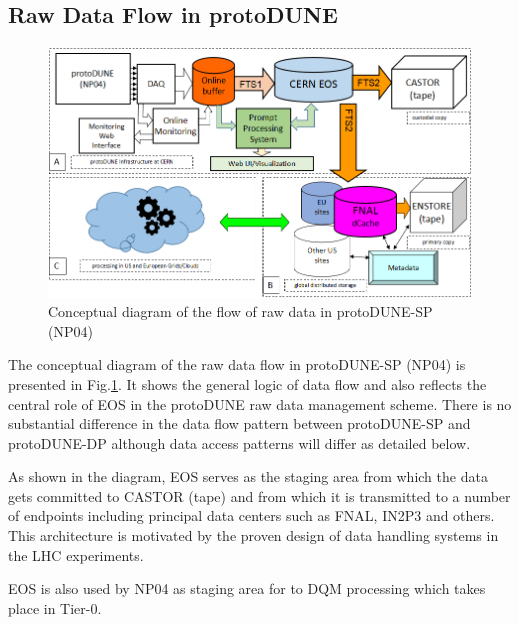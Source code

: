 \documentclass[12pt]{article}
\newcommand{\pd}{protoDUNE\xspace}
\begin{document}
\subsection{Raw Data Flow in \pd}
\label{sec:raw_concept}
\begin{figure}[tbh]
\centering\includegraphics[width=\linewidth]{figures/protoDUNE_data_flow_2017_v2.png}
\caption{\label{fig:raw_concept}Conceptual diagram of the flow of raw data in \pd-SP (NP04)}
\end{figure}

\noindent
The conceptual diagram of the raw data flow in \pd-SP (NP04) is presented in Fig.\ref{fig:raw_concept}. It shows the general logic
of data flow and also reflects the central role of EOS in the \pd raw data management scheme. There is no substantial difference
in the data flow pattern between \pd-SP and \pd-DP although data access patterns will differ as detailed below.

As shown in the diagram, EOS serves as the staging area from which the data gets committed to CASTOR (tape)
and from which it is transmitted to a number of endpoints including principal data centers such as FNAL, IN2P3 and others.
This architecture is motivated by the proven design of data handling systems in the LHC experiments.

EOS is also used by NP04 as staging area for to DQM processing which takes place in Tier-0.


\end{document}
